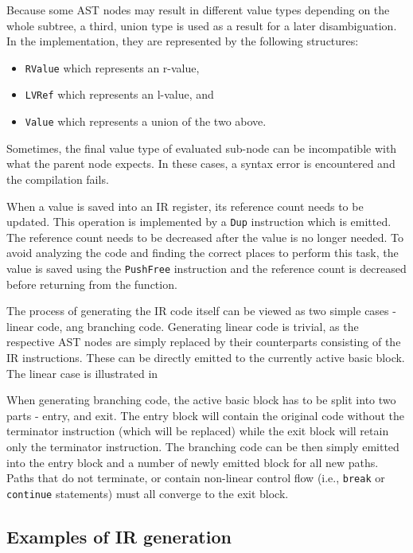Because some AST nodes may result in different value types depending on the whole subtree, a third, union type is used as a result for a later disambiguation. In the implementation, they are represented by the following structures:
\begin{itemize}
\item \texttt{RValue} which represents an r-value,
\item \texttt{LVRef} which represents an l-value, and
\item \texttt{Value} which represents a union of the two above.
\end{itemize}

Sometimes, the final value type of evaluated sub-node can be incompatible with what the parent node expects. In these cases, a syntax error is encountered and the compilation fails.

When a value is saved into an IR register, its reference count needs to be updated. This operation is implemented by a \texttt{Dup} instruction which is emitted. The reference count needs to be decreased after the value is no longer needed. To avoid analyzing the code and finding the correct places to perform this task, the value is saved using the \texttt{PushFree} instruction and the reference count is decreased before returning from the function.

The process of generating the IR code itself can be viewed as two simple cases - linear code, ang branching code. Generating linear code is trivial, as the respective AST nodes are simply replaced by their counterparts consisting of the IR instructions. These can be directly emitted to the currently active basic block. The linear case is illustrated in

When generating branching code, the active basic block has to be split into two parts - entry, and exit. The entry block will contain the original code without the terminator instruction (which will be replaced) while the exit block will retain only the terminator instruction. The branching code can be then simply emitted into the entry block and a number of newly emitted block for all new paths. Paths that do not terminate, or contain non-linear control flow (i.e., \texttt{break} or \texttt{continue} statements) must all converge to the exit block.

\subsection{Examples of IR generation}

